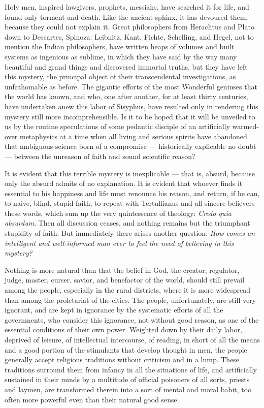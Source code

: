 \documentclass[12pt]{report}
\begin{document}
Holy men, inspired lawgivers, prophets, messiahs, have searched it for life, and found only torment and death. Like the ancient sphinx, it has devoured them, because they could not explain it. Great philosophers from Heraclitus and Plato down to Descartes, Spinoza: Leibnitz, Kant, Fichte, Schelling, and Hegel, not to mention the Indian philosophers, have written heaps of volumes and built systems as ingenious as sublime, in which they have said by the way many beautiful and grand things and discovered immortal truths, but they have left this mystery, the principal object of their transcendental investigations, as unfathomable as before. The gigantic efforts of the most Wonderful geniuses that the world has known, and who, one after another, for at least thirty centuries, have undertaken anew this labor of Sisyphus, have resulted only in rendering this mystery still more incomprehensible. Is it to be hoped that it will be unveiled to us by the routine speculations of some pedantic disciple of an artificially warmed-over metaphysics at a time when all living and serious spirits have abandoned that ambiguous science born of a compromise — historically explicable no doubt — between the unreason of faith and sound scientific reason?


It is evident that this terrible mystery is inexplicable — that is, absurd, because only the absurd admits of no explanation. It is evident that whoever finds it essential to his happiness and life must renounce his reason, and return, if he can, to naive, blind, stupid faith, to repeat with Tertullianus and all sincere believers these words, which sum up the very quintessence of theology: \emph{Credo quia absurdum}. Then all discussion ceases, and nothing remains but the triumphant stupidity of faith. But immediately there arises another question: \emph{How comes an intelligent and well-informed man ever to feel the need of believing in this mystery?}


Nothing is more natural than that the belief in God, the creator, regulator, judge, master, curser, savior, and benefactor of the world, should still prevail among the people, especially in the rural districts, where it is more widespread than among the proletariat of the cities. The people, unfortunately, are still very ignorant, and are kept in ignorance by the systematic efforts of all the governments, who consider this ignorance, not without good reason, as one of the essential conditions of their own power. Weighted down by their daily labor, deprived of leisure, of intellectual intercourse, of reading, in short of all the means and a good portion of the stimulants that develop thought in men, the people generally accept religious traditions without criticism and in a lump. These traditions surround them from infancy in all the situations of life, and artificially sustained in their minds by a multitude of official poisoners of all sorts, priests and laymen, are transformed therein into a sort of mental and moral babit, too often more powerful even than their natural good sense.
\end{document}
